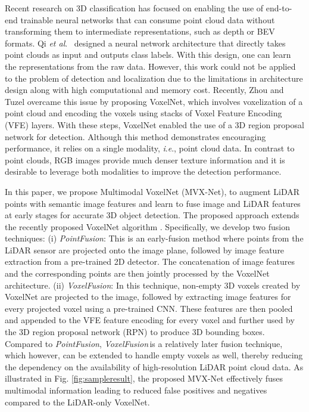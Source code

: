\documentclass[letterpaper, 10 pt, conference]{ieeeconf}
\newcommand{\etal}{\textit{et al}.  {\,}}
\newcommand{\ie}{\textit{i}.\textit{e}.}
\newcommand{\PF}{\textit{PointFusion}}
\newcommand{\VF}{\textit{VoxelFusion}}
\begin{document}
Recent research on 3D classification has focused on enabling the use of end-to-end trainable neural networks that can consume point cloud data without transforming them to intermediate representations, such as depth or BEV formats. Qi \etal \cite{REF:qi2017pointnet} designed a neural network architecture that directly takes point clouds as input and outputs class labels. With this design, one can learn the representations from the raw data. However, this work could not be applied to the problem of detection and localization due to the limitations in architecture design along with high computational and memory cost. Recently, Zhou and Tuzel \cite{REF:zhou2017voxelnet} overcame this issue by proposing VoxelNet, which involves voxelization of a point cloud and encoding the voxels using stacks of Voxel Feature Encoding (VFE) layers. With these steps, VoxelNet enabled the use of a 3D region proposal network for detection. Although this method demonstrates encouraging performance, it relies on a single modality, \ie, point cloud data. In contrast to point clouds, RGB images provide much denser texture information and it is desirable to leverage both modalities to improve the detection performance. 

In this paper, we propose Multimodal VoxelNet (MVX-Net), to augment LiDAR points with semantic image features and learn to fuse image and LiDAR features at early stages for accurate 3D object detection. The proposed approach extends the recently proposed VoxelNet algorithm \cite{REF:zhou2017voxelnet}. Specifically, we develop two fusion techniques: (i) \PF: This is an early-fusion method where points from the LiDAR sensor are projected onto the image plane, followed by image feature extraction from a pre-trained 2D detector. The concatenation of image features and the corresponding points are then jointly processed by the VoxelNet architecture. (ii) \VF: In this technique, non-empty 3D voxels created by VoxelNet are projected to the image, followed by extracting image features for every projected voxel using a pre-trained CNN. These features are then pooled and appended to the VFE feature encoding for every voxel and further used by the 3D region proposal network (RPN) to produce 3D bounding boxes. Compared to \PF, \VF{\,}is a relatively later fusion technique, which however, can be extended to handle empty voxels as well, thereby reducing the dependency on the availability of high-resolution LiDAR point cloud data. As illustrated in Fig. \ref{fig:sampleresult}, the proposed MVX-Net effectively fuses multimodal information leading to reduced false positives and negatives compared to the LiDAR-only VoxelNet. 
\end{document}
